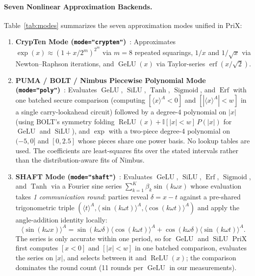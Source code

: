 \documentclass[11pt]{article}
\newcommand{\shareA}[1]{\langle #1 \rangle^{A}}
\begin{document}
\paragraph{Seven Nonlinear Approximation Backends.}
Table~\ref{tab:modes} summarizes the seven approximation modes unified in PriX:
\begin{enumerate}
    \item \textbf{CrypTen Mode (\texttt{mode="crypten"})}~\cite{knott2021crypten}: Approximates $\exp(x) \approx (1 + x / 2^m)^{2^m}$ via $m=8$ repeated squarings, $1/x$ and $1/\sqrt{x}$ via Newton--Raphson iterations, and $\operatorname{GeLU}(x)$ via Taylor-series $\operatorname{erf}(x/\sqrt{2})$.
    \item \textbf{PUMA / BOLT / Nimbus Piecewise Polynomial Mode (\texttt{mode="poly"})}~\cite{dong2023puma,pang2024bolt,li2024nimbus}: Evaluates $\operatorname{GeLU}$, $\operatorname{SiLU}$, $\operatorname{Tanh}$, $\operatorname{Sigmoid}$, and $\operatorname{Erf}$ with one batched secure comparison (computing $[\shareA{x} < 0]$ and $[|\shareA{x}| < w]$ in a single carry-lookahead circuit) followed by a degree-4 polynomial on $|x|$ (using BOLT's symmetry folding $\operatorname{ReLU}(x) + \mathbb{I}[|x| < w]\, P(|x|)$ for $\operatorname{GeLU}$ and $\operatorname{SiLU}$), and $\exp$ with a two-piece degree-4 polynomial on $(-5, 0]$ and $[0, 2.5]$ whose pieces share one power basis. No lookup tables are used. The coefficients are least-squares fits over the stated intervals rather than the distribution-aware fits of Nimbus.
    \item \textbf{SHAFT Mode (\texttt{mode="shaft"})}~\cite{kei2025shaft}: Evaluates $\operatorname{GeLU}$, $\operatorname{SiLU}$, $\operatorname{Erf}$, $\operatorname{Sigmoid}$, and $\operatorname{Tanh}$ via a Fourier sine series $\sum_{k=1}^{K} \beta_k \sin(k \omega x)$ whose evaluation takes \emph{1 communication round}: parties reveal $\delta = x - t$ against a pre-shared trigonometric triple $(\shareA{t}, \shareA{\sin(k \omega t)}, \shareA{\cos(k \omega t)})$ and apply the angle-addition identity locally:
    \begin{equation}
        \shareA{\sin(k \omega x)} = \sin(k \omega \delta)\shareA{\cos(k \omega t)} + \cos(k \omega \delta)\shareA{\sin(k \omega t)}.
        \label{eq:shaft_trig}
    \end{equation}
    The series is only accurate within one period, so for $\operatorname{GeLU}$ and $\operatorname{SiLU}$ PriX first computes $[x < 0]$ and $[|x| < w]$ in one batched comparison, evaluates the series on $|x|$, and selects between it and $\operatorname{ReLU}(x)$; the comparison dominates the round count (11 rounds per $\operatorname{GeLU}$ in our measurements).

\end{enumerate}
\end{document}
